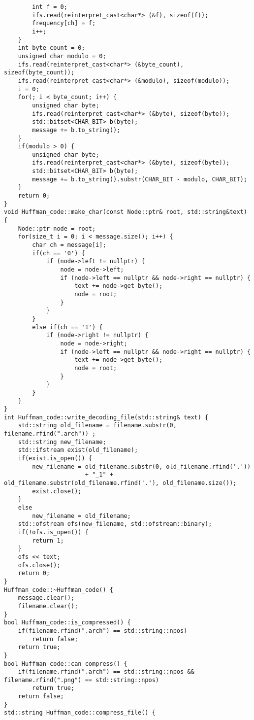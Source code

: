 \begin{verbatim}
        int f = 0;
        ifs.read(reinterpret_cast<char*> (&f), sizeof(f));
        frequency[ch] = f;
        i++;
    }
    int byte_count = 0;
    unsigned char modulo = 0;
    ifs.read(reinterpret_cast<char*> (&byte_count), sizeof(byte_count));
    ifs.read(reinterpret_cast<char*> (&modulo), sizeof(modulo));
    i = 0;
    for(; i < byte_count; i++) {
        unsigned char byte;
        ifs.read(reinterpret_cast<char*> (&byte), sizeof(byte));
        std::bitset<CHAR_BIT> b(byte);
        message += b.to_string();
    }
    if(modulo > 0) {
        unsigned char byte;
        ifs.read(reinterpret_cast<char*> (&byte), sizeof(byte));
        std::bitset<CHAR_BIT> b(byte);
        message += b.to_string().substr(CHAR_BIT - modulo, CHAR_BIT);
    }
    return 0;
}
void Huffman_code::make_char(const Node::ptr& root, std::string&text) {
    Node::ptr node = root;
    for(size_t i = 0; i < message.size(); i++) {
        char ch = message[i];
        if(ch == '0') {
            if (node->left != nullptr) {
                node = node->left;
                if (node->left == nullptr && node->right == nullptr) {
                    text += node->get_byte();
                    node = root;
                }
            }
        }
        else if(ch == '1') {
            if (node->right != nullptr) {
                node = node->right;
                if (node->left == nullptr && node->right == nullptr) {
                    text += node->get_byte();
                    node = root;
                }
            }
        }
    }
}
int Huffman_code::write_decoding_file(std::string& text) {
    std::string old_filename = filename.substr(0, filename.rfind(".arch")) ;
    std::string new_filename;
    std::ifstream exist(old_filename);
    if(exist.is_open()) {
        new_filename = old_filename.substr(0, old_filename.rfind('.'))
                       + "_1" + old_filename.substr(old_filename.rfind('.'), old_filename.size());
        exist.close();
    }
    else
        new_filename = old_filename;
    std::ofstream ofs(new_filename, std::ofstream::binary);
    if(!ofs.is_open()) {
        return 1;
    }
    ofs << text;
    ofs.close();
    return 0;
}
Huffman_code::~Huffman_code() {
    message.clear();
    filename.clear();
}
bool Huffman_code::is_compressed() {
    if(filename.rfind(".arch") == std::string::npos)
        return false;
    return true;
}
bool Huffman_code::can_compress() {
    if(filename.rfind(".arch") == std::string::npos && filename.rfind(".png") == std::string::npos)
        return true;
    return false;
}
std::string Huffman_code::compress_file() {

\end{verbatim}
